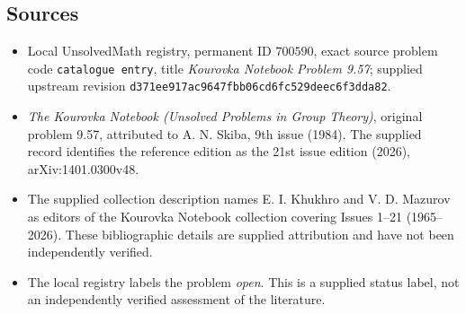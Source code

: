 \documentclass[11pt]{article}
\begin{document}
\subsection{Sources}
\begin{itemize}
\item Local UnsolvedMath registry, permanent ID \(700590\), exact source problem code \texttt{catalogue entry}, title \emph{Kourovka Notebook Problem 9.57}; supplied upstream revision \texttt{d371ee917ac9647fbb06cd6fc529deec6f3dda82}.
\item \emph{The Kourovka Notebook (Unsolved Problems in Group Theory)}, original problem 9.57, attributed to A. N. Skiba, 9th issue (1984). The supplied record identifies the reference edition as the 21st issue edition (2026), arXiv:1401.0300v48.
\item The supplied collection description names E. I. Khukhro and V. D. Mazurov as editors of the Kourovka Notebook collection covering Issues 1--21 (1965--2026). These bibliographic details are supplied attribution and have not been independently verified.
\item The local registry labels the problem \emph{open}. This is a supplied status label, not an independently verified assessment of the literature.
\end{itemize}
\end{document}
